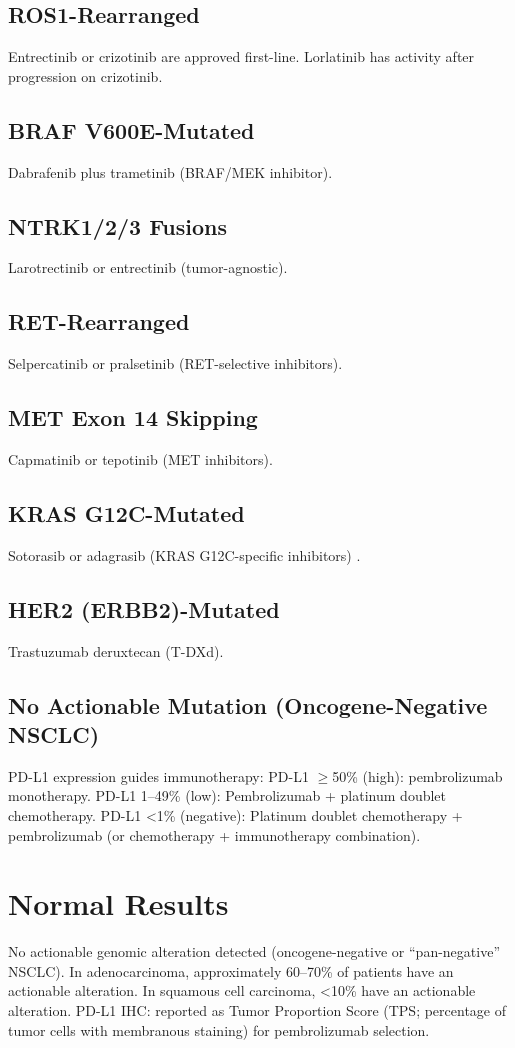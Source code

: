 \subsection*{ROS1-Rearranged}
Entrectinib or crizotinib are approved first-line. Lorlatinib has activity after progression on crizotinib.

\subsection*{BRAF V600E-Mutated}
Dabrafenib plus trametinib (BRAF/MEK inhibitor).

\subsection*{NTRK1/2/3 Fusions}
Larotrectinib or entrectinib (tumor-agnostic).

\subsection*{RET-Rearranged}
Selpercatinib or pralsetinib (RET-selective inhibitors).

\subsection*{MET Exon 14 Skipping}
Capmatinib or tepotinib (MET inhibitors).

\subsection*{KRAS G12C-Mutated}
Sotorasib or adagrasib (KRAS G12C-specific inhibitors) \cite{skoulidis2021sotorasib}.

\subsection*{HER2 (ERBB2)-Mutated}
Trastuzumab deruxtecan (T-DXd).

\subsection*{No Actionable Mutation (Oncogene-Negative NSCLC)}
PD-L1 expression guides immunotherapy: PD-L1 $\geq$50\% (high): pembrolizumab monotherapy. PD-L1 1--49\% (low): Pembrolizumab + platinum doublet chemotherapy. PD-L1 <1\% (negative): Platinum doublet chemotherapy + pembrolizumab (or chemotherapy + immunotherapy combination).

\section*{Normal Results}
No actionable genomic alteration detected (oncogene-negative or ``pan-negative'' NSCLC). In adenocarcinoma, approximately 60--70\% of patients have an actionable alteration. In squamous cell carcinoma, <10\% have an actionable alteration. PD-L1 IHC: reported as Tumor Proportion Score (TPS; percentage of tumor cells with membranous staining) for pembrolizumab selection.

